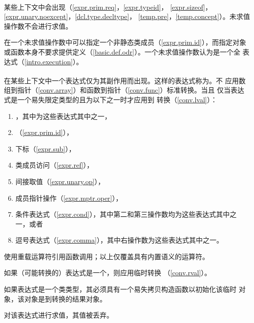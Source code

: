 \paragraph{} %
某些上下文中会出现（\ref{expr.prim.req}，\ref{expr.typeid}，
\ref{expr.sizeof}，\ref{expr.unary.noexcept}，\ref{dcl.type.decltype}，
\ref{temp.pre}，\ref{temp.concept}）。未求值操作数不会进行求值。

\begin{note}
  在一个未求值操作数中可以指定一个非静态类成员（\ref{expr.prim.id}），而指定对象
  或函数本身不要求提供定义（\ref{basic.def.odr}）。一个未求值操作数认为是一个全
  表达式（\ref{intro.execution}）。
\end{note}

\paragraph{} %
在某些上下文中一个表达式仅为其副作用而出现。这样的表达式称为。不
应用数组到指针（\ref{conv.array}）和函数到指针（\ref{conv.func}）标准转换。当且
仅当表达式是一个易失限定类型的\glvalue{}且为以下之一时才应用\lvalue{}到\rvalue{}
转换（\ref{conv.lval}）：
\begin{enumerate}
  \item \tm{(}  \tm{)}，其中为这些表达式其中之一，
  \item {}（\ref{expr.prim.id}），
  \item 下标（\ref{expr.sub}），
  \item 类成员访问（\ref{expr.ref}），
  \item 间接取值（\ref{expr.unary.op}），
  \item 成员指针操作（\ref{expr.mptr.oper}），
  \item 条件表达式（\ref{expr.cond}），其中第二和第三操作数均为这些表达式其中之
        一，或者
  \item 逗号表达式（\ref{expr.comma}），其中右操作数为这些表达式其中之一。
\end{enumerate}

\begin{note}
  使用重载运算符引用函数调用；以上仅覆盖具有内置语义的运算符。
\end{note}

如果（可能转换的）表达式是一个\prvalue{}，则应用临时\mat{}转换
（\ref{conv.rval}）。

\begin{note}
  如果表达式是一个类类型\lvalue{}，其必须具有一个易失拷贝构造函数以初始化该临时
  对象，该对象是\lvalue{}到\rvalue{}转换的结果对象。
\end{note}

对该\glvalue{}表达式进行求值，其值被丢弃。
